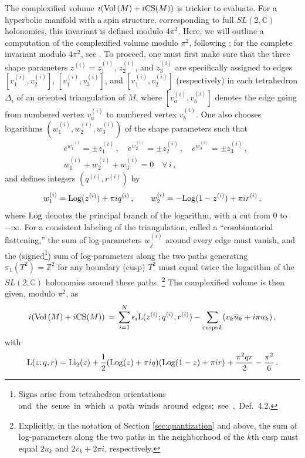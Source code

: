 \documentclass[hyper]{JHEP3}
\newcommand{\C}{{\mathbb{C}}}
\newcommand{\Z}{{\mathbb{Z}}}
\newcommand\be{\begin{equation}}
\newcommand\ee{\end{equation}}
\newcommand{\Vol}{{\mbox{Vol\,}}}
\def\Li{\text{Li}_2}
\begin{document}
The complexified volume $i(\Vol(M)+i{\rm CS}(M))$ is trickier to evaluate. For a hyperbolic manifold with a spin structure, corresponding to full $SL(2,\C)$ holonomies, this invariant is defined modulo $4\pi^2$. Here, we will outline a computation of the complexified volume modulo $\pi^2$, following \cite{neumann-2004}; for the complete invariant modulo $4\pi^2$, see \cite{zickert-2008}. To proceed, one must first make sure that the three shape parameters $z^{(i)}=z_1^{(i)}$, $z_2^{(i)}$, and $z_3^{(i)}$ are specifically assigned to edges $[v_1^{(i)},v_2^{(i)}]$, $[v_1^{(i)},v_3^{(i)}]$, and $[v_1^{(i)},v_2^{(i)}]$ (respectively) in each tetrahedron $\Delta_i$ of an oriented triangulation of $M$, where $[v_a^{(i)},v_b^{(i)}]$ denotes the edge going from numbered vertex $v_a^{(i)}$ to numbered vertex $v_b^{(i)}$. One also chooses logarithms $(w_1^{(i)},w_2^{(i)},w_3^{(i)})$ of the shape parameters such that
%
\begin{subequations}
\begin{align}& e^{w^{(i)}_1}=\pm z^{(i)}_1\,,\quad e^{w^{(i)}_2}=\pm z^{(i)}_2\,, \quad e^{w^{(i)}_3}=\pm z^{(i)}_3\,, \\
& w^{(i)}_1+w^{(i)}_2+w^{(i)}_3 = 0\quad \forall\,i\,,
\end{align}
\end{subequations}
%
and defines integers $(q^{(i)},r^{(i)})$ by
%
\be w_1^{(i)}={\rm Log}(z^{(i)})+\pi i q^{(i)}\,,\qquad w_2^{(i)}=-{\rm Log}(1-z^{(i)})+\pi i r^{(i)}\,, \ee
%
where ${\rm Log}$ denotes the principal branch of the logarithm, with a cut from $0$ to $-\infty$. For a consistent labeling of the  triangulation, called a ``combinatorial flattening,'' the sum of log-parameters $w^{(i)}_j$ around every edge must vanish, and the (signed\footnote{Signs arise from tetrahedron orientations and~the~sense~in~which~a~path~winds~around~edges;~see~\cite{neumann-2004},~Def.~4.2.}) sum of log-parameters along the two paths generating $\pi_1(T^2)=\Z^2$ for any boundary (cusp) $T^2$ must equal twice the logarithm of the $SL(2,\C)$ holonomies around these paths.%
%
\footnote{\label{foot:v2pi}Explicitly, in the notation of Section \ref{sec:quantization} and above, the sum of log-parameters along the two paths in the neighborhood of the $k$th cusp must equal $2u_k$ and $2v_k+2\pi i$, respectively. 
} %
%
The complexified volume is then given, modulo $\pi^2$, as
%
\be i(\Vol(M)+i {\rm CS}(M)) \,=\, \sum_{i=1}^N \epsilon_i {\rm L}(z^{(i)};q^{(i)},r^{(i)}) - \sum_{{\rm cusps}\,k}(v_k\overline{u}_k+i\pi u_k)\,, \label{CSVolM}\ee
%
with
%
\be {\rm L}(z;q,r) = \Li(z)+\frac{1}{2}({\rm Log}(z)+\pi i q)({\rm Log}(1-z)+\pi i r) + \frac{\pi^2qr}{2} - \frac{\pi^2}{6}\,. \label{RogersL} \ee
\end{document}
